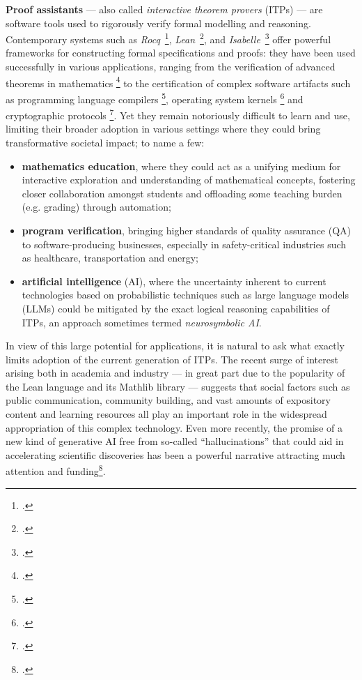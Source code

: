 \documentclass[12pt,draftproposal]{msca-pf}
\begin{document}
\textbf{Proof assistants} --- also called \emph{interactive theorem provers} (ITPs) --- are software
tools used to rigorously verify formal modelling and reasoning. Contemporary systems such as
\emph{Rocq}~\footcite{the_rocq_development_team_2025_15149629},
\emph{Lean}~\footcite{10.1007/978-3-030-79876-5_37}, and
\emph{Isabelle}~\footcite{nipkow2002isabelle} offer powerful frameworks for constructing formal
specifications and proofs: they have been used successfully in various applications, ranging from
the verification of advanced theorems in mathematics
\footcite{gonthierFormalProofFour2008}
to the certification of complex software artifacts such as programming language compilers
\footcite{leroyFormalVerificationRealistic2009}, operating system kernels
\footcite{kleinSeL4FormalVerification2009} and cryptographic protocols \footcite{Barthe2014}. Yet
they remain notoriously difficult to learn and use, limiting their broader adoption in various
settings where they could bring transformative societal impact; to name a few:
\begin{itemize}
    \item \textbf{mathematics education}, where they could act as a unifying medium for interactive
    exploration and understanding of mathematical concepts, fostering closer collaboration amongst
    students and offloading some teaching burden (e.g. grading) through automation;
    \item \textbf{program verification}, bringing higher standards of quality assurance (QA) to software-producing businesses, especially in safety-critical industries such as healthcare, transportation and energy;
    \item \textbf{artificial intelligence} (AI), where the uncertainty inherent to current technologies
    based on probabilistic techniques such as large language models (LLMs) could be mitigated by the
    exact logical reasoning capabilities of ITPs, an approach sometimes termed \emph{neurosymbolic
    AI}.
\end{itemize}
In view of this large potential for applications, it is natural to ask what exactly limits adoption
of the current generation of ITPs. The recent surge of interest arising both in academia and
industry --- in great part due to the popularity of the Lean language and its Mathlib library ---
suggests that social factors such as public communication, community building, and vast amounts of
expository content and learning resources all play an important role in the widespread appropriation
of this complex technology. Even more recently, the promise of a new kind of generative AI free from
so-called ``hallucinations'' that could aid in accelerating scientific discoveries has been a
powerful narrative attracting much attention and funding\footcite{TODO: reference to some media
outlet announcing some startup funding like Harmonic, or maybe to the Lean FRO roadmap}.
\end{document}
